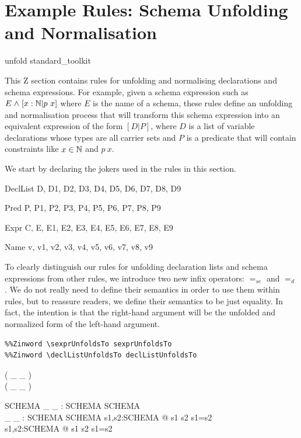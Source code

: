 \documentclass{entcs}
\newcommand{\sexprUnfoldsTo}{\mathrel{=_{se}}}
\newcommand{\declListUnfoldsTo}{\mathrel{=_d}}
\begin{document}
\section{Example Rules: Schema Unfolding and Normalisation} \label{sec:schemas}

\begin{zsection}
  \SECTION unfold \parents standard\_toolkit
\end{zsection}

This Z section contains rules for unfolding and normalising declarations
and schema expressions.  For example, given a schema expression such as $E
\mathrel{\mathstrut{\wedge}} [x:{\mathbb N} | p~x]$ where $E$ is the name of a schema, these rules define
an unfolding and normalisation process that will transform this schema
expression into an equivalent expression of the form $[D|P]$, where $D$ is
a list of variable declarations whose types are all carrier sets and $P$ is
a predicate that will contain constraints like $x \in {\mathbb N}$ and $p~x$.

We start by declaring the jokers used in the rules in this section.

\begin{zedjoker}{DeclList} D, D1, D2, D3, D4, D5, D6, D7, D8, D9 \end{zedjoker}
\begin{zedjoker}{Pred} P, P1, P2, P3, P4, P5, P6, P7, P8, P9 \end{zedjoker}
\begin{zedjoker}{Expr} C, E, E1, E2, E3, E4, E5, E6, E7, E8, E9 \end{zedjoker}
\begin{zedjoker}{Name} v, v1, v2, v3, v4, v5, v6, v7, v8, v9 \end{zedjoker}

To clearly distinguish our rules for unfolding declaration lists and
schema expressions from other rules, we introduce two new infix
operators: $\sexprUnfoldsTo$ and $\declListUnfoldsTo$.  
We do not really need to define their semantics in order to use them within
rules, but to reassure readers, we define their semantics to be just
equality.  In fact, the intention is that the right-hand argument
will be the unfolded and normalized form of the left-hand argument.

\begin{verbatim}
%%Zinword \sexprUnfoldsTo sexprUnfoldsTo
%%Zinword \declListUnfoldsTo declListUnfoldsTo
\end{verbatim}
%
\begin{zed}
  \relation ( \_ \sexprUnfoldsTo \_ ) \\
  \relation ( \_ \declListUnfoldsTo \_ )
\end{zed}
%
\begin{gendef}{SCHEMA}
  \_ \sexprUnfoldsTo \_ : SCHEMA \rel SCHEMA \\
  \_ \declListUnfoldsTo \_ : SCHEMA \rel SCHEMA
\where
  \forall s1,s2:SCHEMA @ s1 \sexprUnfoldsTo s2 \iff s1=s2 \\
  \forall s1,s2:SCHEMA @ s1 \declListUnfoldsTo s2 \iff s1=s2 \\
\end{gendef}
\end{document}
